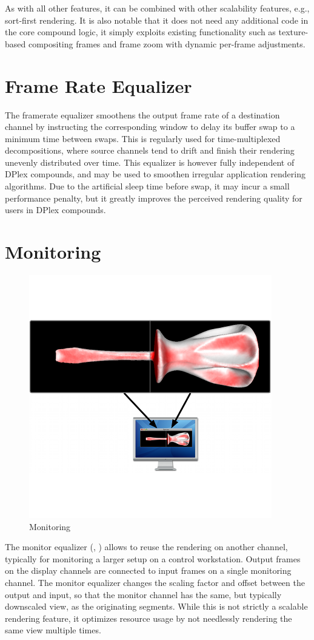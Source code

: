 As with all other features, it can be combined with other scalability features,
e.g., sort-first rendering. It is also notable that it does not need any
additional code in the core compound logic, it simply exploits existing
functionality such as texture-based compositing frames and frame zoom with
dynamic per-frame adjustments.

\section{Frame Rate Equalizer}\label{sFramerateEq}

The framerate equalizer smoothens the output frame rate of a destination channel
by instructing the corresponding window to delay its buffer swap to a minimum
time between swaps. This is regularly used for time-multiplexed decompositions,
where source channels tend to drift and finish their rendering unevenly
distributed over time. This equalizer is however fully independent of DPlex
compounds, and may be used to smoothen irregular application rendering
algorithms. Due to the artificial sleep time before swap, it may incur a small
performance penalty, but it greatly improves the perceived rendering quality for
users in DPlex compounds.

\section{Monitoring}
\begin{figure}
  \includegraphics[width=.382\textwidth]{images/monitoreq}
  \caption{\label{fmonitor}Monitoring}
\end{figure}
The monitor equalizer (, ) allows to reuse the
rendering on another channel, typically for monitoring a larger setup on a
control workstation. Output frames on the display channels are connected to
input frames on a single monitoring channel. The monitor equalizer changes the
scaling factor and offset between the output and input, so that the monitor
channel has the same, but typically downscaled view, as the originating
segments. While this is not strictly a scalable rendering feature, it optimizes
resource usage by not needlessly rendering the same view multiple times.



